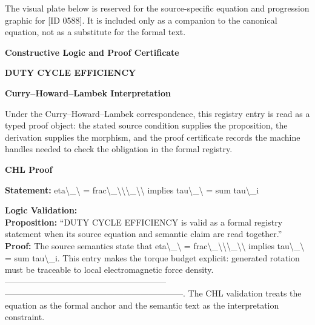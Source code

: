 \begingroup\footnotesize\sloppy
The visual plate below is reserved for the source-specific equation and progression graphic for [ID 0588]. It is included only as a companion to the canonical equation, not as a substitute for the formal text.
\par\endgroup
\ifTZPDarkEdition
{}
\fi

\clearpage
\begingroup\tzpsupportsetup
\noindent\textbf{\fontsize{10.8pt}{12.8pt}\selectfont [ID 0588] Constructive Logic and Proof Certificate}\par
\noindent\textbf{\fontsize{10pt}{12pt}\selectfont DUTY CYCLE EFFICIENCY}\par
\vspace{0.45em}
\begingroup
\footnotesize
\setlength{\parskip}{0.22em}
\setlength{\parindent}{0pt}
\noindent\textbf{Curry--Howard--Lambek Interpretation}\par
Under the Curry--Howard--Lambek correspondence, this registry entry is read as a typed proof
object: the stated source condition supplies the proposition, the derivation supplies the
morphism, and the proof certificate records the machine handles needed to check the obligation
in the formal registry.

\vspace{0.45em}
\noindent\textbf{CHL Proof}\par
\textbf{Statement:} eta\textbackslash{}\_\textbackslash{} = frac\textbackslash{}\_\textbackslash{}\textbackslash{}\textbackslash{}\_\textbackslash{}\textbackslash{} implies tau\textbackslash{}\_\textbackslash{} = sum tau\textbackslash{}\_i

\textbf{Logic Validation:}\\
\textbf{Proposition:} ``DUTY CYCLE EFFICIENCY is valid as a formal registry statement when its source equation
and semantic claim are read together.''\\
\textbf{Proof:} The source semantics state that eta\textbackslash{}\_\textbackslash{} = frac\textbackslash{}\_\textbackslash{}\textbackslash{}\textbackslash{}\_\textbackslash{}\textbackslash{} implies tau\textbackslash{}\_\textbackslash{} = sum tau\textbackslash{}\_i. This
entry makes the torque budget explicit: generated rotation must be traceable to local
electromagnetic force density. ---------------------------------------------------------
---------------------------------------------------------------. The CHL validation
treats the equation as the formal anchor and the semantic text as the interpretation
constraint.

